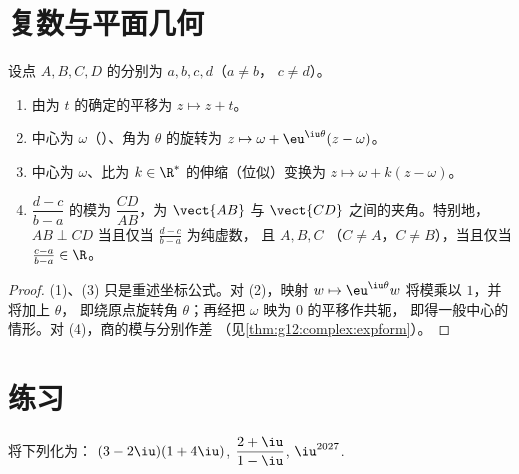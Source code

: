 \section{复数与平面几何}

\begin{proposition}[几何对应]\label{prop:g12:complex:geometry}
设点 $A, B, C, D$ 的分别为 $a, b, c, d$（$a \neq b$，
$c \neq d$）。
\begin{enumerate}
  \item 由为 $t$ 的确定的平移为 $z \mapsto z + t$。
  \item 中心为 $\omega$（）、角为 $\theta$ 的旋转为
        $z \mapsto \omega + \eu^{\iu\theta}(z - \omega)$。
  \item 中心为 $\omega$、比为
        $k \in \R^*$ 的伸缩（位似）变换为 $z \mapsto \omega + k(z - \omega)$。
  \item $\dfrac{d - c}{b - a}$ 的模为 $\dfrac{CD}{AB}$，为
         $\vect{AB}$ 与 $\vect{CD}$ 之间的夹角。特别地，
        $AB \perp CD$ 当且仅当 $\frac{d-c}{b-a}$ 为纯虚数，
        且 $A, B, C$ （$C \ne A$，$C\ne B$），当且仅当
        $\frac{c-a}{b-a} \in \R$。
\end{enumerate}
\end{proposition}

\begin{proof}
(1)、(3) 只是重述坐标公式。对 (2)，映射
$w \mapsto \eu^{\iu\theta} w$ 将模乘以 $1$，并将加上 $\theta$，
即绕原点旋转角 $\theta$；再经把 $\omega$ 映为 $0$ 的平移作共轭，
即得一般中心的情形。对
(4)，商的模与分别作差
（见\cref{thm:g12:complex:expform}）。
\end{proof}

\section{练习}

\begin{exercise}[$\star$]\label{exo:g12:complex:1}
将下列化为：
$(3 - 2\iu)(1 + 4\iu)$, \quad $\dfrac{2 + \iu}{1 - \iu}$, \quad
$\iu^{2027}$.
\end{exercise}

